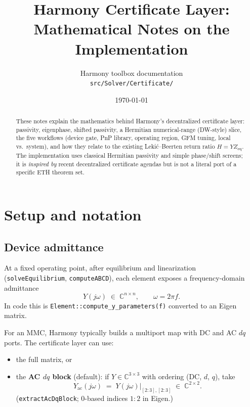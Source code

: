 \documentclass[11pt,a4paper]{article}
\title{Harmony Certificate Layer:\\
Mathematical Notes on the Implementation}
\author{Harmony toolbox documentation\\
\texttt{src/Solver/Certificate/}}
\date{\today}
\theoremstyle{definition}
\begin{document}
\maketitle

\begin{abstract}
These notes explain the mathematics behind Harmony's decentralized certificate
layer: passivity, eigenphase, shifted passivity, a Hermitian numerical-range
(DW-style) slice, the five workflows (device gate, PnP library, operating region,
GFM tuning, local vs.\ system), and how they relate to the existing
Leki\'c--Beerten return ratio $H=YZ_{\mathrm{eq}}$.
The implementation uses classical Hermitian passivity and simple phase/shift
screens; it is \emph{inspired by} recent decentralized certificate agendas
but is not a literal port of a specific ETH theorem set.
\end{abstract}

\tableofcontents
\newpage

\section{Setup and notation}

\subsection{Device admittance}

At a fixed operating point, after equilibrium and linearization
(\texttt{solveEquilibrium}, \texttt{computeABCD}), each element exposes a
frequency-domain admittance
\begin{equation}
  Y(j\omega)\;\in\;\mathbb{C}^{n\times n},
  \qquad \omega = 2\pi f.
\end{equation}
In code this is \texttt{Element::compute\_y\_parameters(f)} converted to an
Eigen matrix.

For an MMC, Harmony typically builds a multiport map with DC and AC $dq$
ports. The certificate layer can use:
\begin{itemize}[leftmargin=*]
  \item the full matrix, or
  \item the \textbf{AC $dq$ block} (default): if $Y\in\mathbb{C}^{3\times 3}$
  with ordering (DC, $d$, $q$), take
  \begin{equation}
    Y_{\mathrm{ac}}(j\omega)
    \;=\;
    Y(j\omega)\big|_{[2:3],[2:3]}
    \;\in\;\mathbb{C}^{2\times 2}.
  \end{equation}
  (\texttt{extractAcDqBlock}; 0-based indices $1\!:\!2$ in Eigen.)
\end{itemize}
\end{document}
